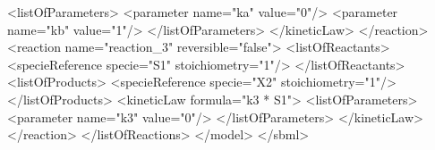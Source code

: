 \documentclass{cekarticle}
\begin{document}
\begin{example}
                    <listOfParameters>
                        <parameter name="ka" value="0"/>
                        <parameter name="kb" value="1"/>
                    </listOfParameters>
                </kineticLaw>
            </reaction>
            <reaction name="reaction_3" reversible="false">
                <listOfReactants>
                    <specieReference specie="S1" stoichiometry="1"/>
                </listOfReactants>
                <listOfProducts>
                    <specieReference specie="X2" stoichiometry="1"/>
                </listOfProducts>
                <kineticLaw formula="k3 * S1">
                    <listOfParameters>
                        <parameter name="k3" value="0"/>
                    </listOfParameters>
                </kineticLaw>
            </reaction>
        </listOfReactions>
    </model>
</sbml>
\end{example}




\end{document}
